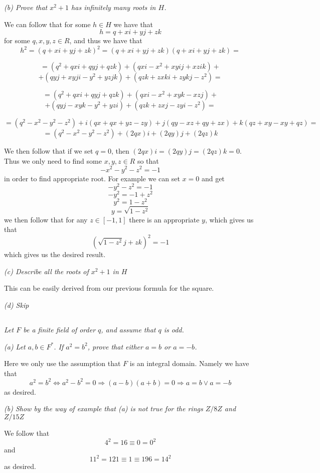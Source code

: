 \documentclass[11pt,oneside,titlepage]{book}
\DeclareMathOperator \lra {\Leftrightarrow}
\DeclareMathOperator \ra {\Rightarrow}
\begin{document}
\textit{(b) Prove that $x^2 + 1$ has infinitely many roots in $H$.}

We can follow that for some $h \in H$ we have that
$$h = q + xi + yj + zk$$
for some $q, x, y, z \in R$, and thus we have that 
$$h^2 = (q + xi + yj + zk)^2 = (q + xi + yj + zk)(q + xi + yj + zk) = $$

$$= (q^2 + qxi+ qyj + qzk) + (qxi - x^2 + xyij + xzik) + $$
$$+ (qyj + xyji - y^2 + yzjk) + (qzk + zxki + zykj - z^2) = $$

$$= (q^2 + qxi+ qyj + qzk) + (qxi - x^2 + xyk - xzj) + $$
$$+ (qyj - xyk - y^2 + yzi) + (qzk + zxj - zyi - z^2) = $$

$$= (q^2 - x^2 - y^2 - z^2) + i(qx + qx + yz - zy) +
j(qy - xz + qy + zx) + k(qz + xy - xy + qz) = $$
$$= (q^2 - x^2 - y^2 - z^2) + (2qx) i + (2qy) j + (2qz) k$$

We then follow that if we set $q = 0$, then $(2qx) i = (2qy) j = (2qz) k = 0$.
Thus we only need to find some $x, y, z \in R$ so that
$$- x^2 - y^2 - z^2 = -1$$
in order to find appropriate root. For example we can set $x = 0$ and get
$$- y^2 - z^2 = -1$$
$$- y^2  = -1 + z^2$$
$$y^2  = 1 - z^2$$
$$y  = \sqrt{1 - z^2}$$
we then follow that for any $z \in [-1, 1]$ there  is an appropriate $y$, which
gives us that
$$(\sqrt{1 - z^2} j + zk)^2 = -1$$
which gives us the desired result.

\textit{(c) Describe all the roots of $x^2 + 1$ in $H$}

This can be easily derived from our previous formula for the square.

\textit{(d) Skip}

\subsection{}

\textit{Let $F$ be a finite field of order $q$, and assume that $q$ is
  odd.}

\textit{(a) Let $a, b \in F^*$. If $a^2 = b^2$, prove that either $a =
  b$ or $a = -b$.}

Here we only use the assumption that $F$ is an integral domain. Namely we have that
$$a^2 = b^2 \lra a^2 - b^2 = 0 \ra (a - b) (a + b) = 0 \ra a = b \lor a = -b$$
as desired.

\textit{(b) Show by the way of example that (a) is not true for the
  rings $Z/8Z$ and $Z/15Z$}

We follow that
$$4^2 = 16 \equiv 0 = 0^2$$
and
$$11^2 = 121 \equiv 1 \equiv 196 = 14^2$$
as desired.
\end{document}

